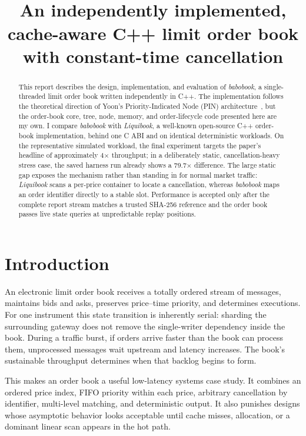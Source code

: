 \documentclass[10pt,twocolumn]{article}
\title{\vspace{-1.5em}
\resizebox{0.98\textwidth}{!}{\textbf{How I Beat the Throughput of a Popular C++ Order Book by 4$\times$}}\\[-0.05em]
\normalsize An independently implemented, cache-aware C++ limit order book with constant-time cancellation}
\author{\normalsize \todo{author name and GitHub URL}}
\date{}
\begin{document}
\fontsize{9.5}{11.2}\selectfont
\maketitle
\vspace{-1.4em}

\begin{abstract}
This report describes the design, implementation, and evaluation of \textit{babobook}, a
single-threaded limit order book written independently in C++.  The
implementation follows the theoretical direction of Yoon's
Priority-Indicated Node (PIN) architecture~\cite{yoon2026}, but the order-book core, tree, node,
memory, and order-lifecycle code presented here are my own.  I compare \textit{babobook}
with \textit{Liquibook}, a well-known open-source C++ order-book implementation, behind one
C ABI and on identical deterministic workloads.  On the representative
simulated workload, the final experiment targets the paper's headline of
approximately 4$\times$ throughput; in a deliberately static, cancellation-heavy
stress case, the saved harness run already shows a 79.7$\times$ difference.  The
large static gap exposes the mechanism rather than standing in for normal
market traffic: \textit{Liquibook} scans a per-price container to locate a cancellation,
whereas \textit{babobook} maps an order identifier directly to a stable slot.  Performance
is accepted only after the complete report stream matches a trusted SHA-256
reference and the order book passes live state queries at unpredictable replay
positions.
\end{abstract}

\section{Introduction}

An electronic limit order book receives a totally ordered stream of messages,
maintains bids and asks, preserves price--time priority, and determines
executions.  For one instrument this state transition is inherently
serial: sharding the surrounding gateway does not remove the single-writer
dependency inside the book.  During a traffic burst, if orders arrive faster
than the book can process them, unprocessed messages wait upstream and latency
increases.  The book's sustainable throughput determines when that backlog
begins to form.

This makes an order book a useful low-latency systems case study.  It combines an
ordered price index, FIFO priority within each price, arbitrary cancellation by
identifier, multi-level matching, and deterministic output.  It also punishes
designs whose asymptotic behavior looks acceptable until cache misses,
allocation, or a dominant linear scan appears in the hot path.
\end{document}
